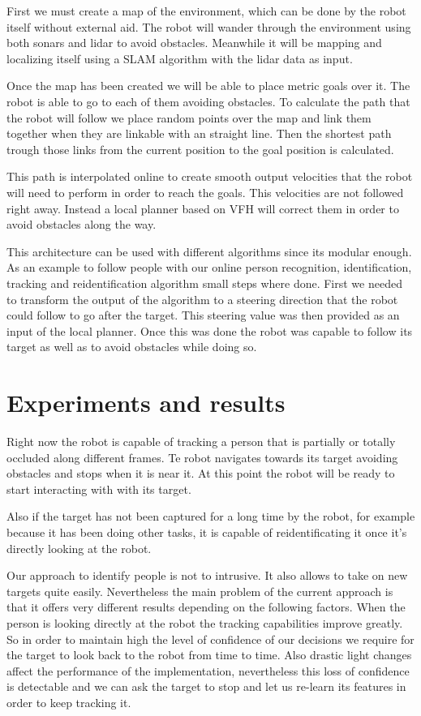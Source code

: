 First we must create a map of the environment, which can be done by the robot itself without external aid.
The robot will wander through the environment using both sonars and lidar to avoid obstacles.
Meanwhile it will be mapping and localizing itself using a SLAM algorithm with the lidar data as input.

Once the map has been created we will be able to place metric goals over it.
The robot is able to go to each of them avoiding obstacles.
To calculate the path that the robot will follow we place random points over the map and link them together when they are linkable with an straight line.
Then the shortest path trough those links from the current position to the goal position is calculated.

This path is interpolated online to create smooth output velocities that the robot will need to perform in order to reach the goals.
This velocities are not followed right away.
Instead a local planner based on VFH will correct them in order to avoid obstacles along the way.

This architecture can be used with different algorithms since its modular enough.
As an example to follow people with our online person recognition, identification, tracking and reidentification algorithm small steps where done.
First we needed to transform the output of the algorithm to a steering direction that the robot could follow to go after the target.
This steering value was then provided as an input of the local planner.
Once this was done the robot was capable to follow its target as well as to avoid obstacles while doing so.

\section{Experiments and results}
Right now the robot is capable of tracking a person that is partially or totally occluded along different frames.
Te robot navigates towards its target avoiding obstacles and stops when it is near it.
At this point the robot will be ready to start interacting with with its target.

Also if the target has not been captured for a long time by the robot, for example because it has been doing other tasks, it is capable of reidentificating it once it's directly looking at the robot.

Our approach to identify people is not to intrusive.
It also allows to take on new targets quite easily.
Nevertheless the main problem of the current approach is that it offers very different results depending on the following factors.
When the person is looking directly at the robot the tracking capabilities improve greatly.
So in order to maintain high the level of confidence of our decisions we require for the target to look back to the robot from time to time.
Also drastic light changes affect the performance of the implementation, nevertheless this loss of confidence is detectable and we can ask the target to stop and let us re-learn its features in order to keep tracking it.


